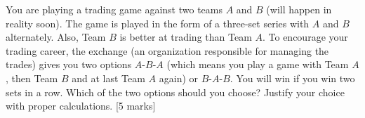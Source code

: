 
\begin{que}
	You are playing a trading game against two teams $A$ and $B$ (will
	happen in reality soon). The game is played in the form of a three-set
	series with $A$ and $B$ alternately. Also, Team $B$ is better at
	trading than Team $A$. To encourage your trading career, the exchange
	(an organization responsible for managing the trades) gives you two
	options $A$-$B$-$A$ (which means you play a game with Team $A$, then
	Team $B$ and at last Team $A$ again) or $B$-$A$-$B$. You will win if
	you win two sets in a row. Which of the two options should you choose?
	Justify your choice with proper calculations.
	\hspace*{\fill} [5 marks]
\end{que}

